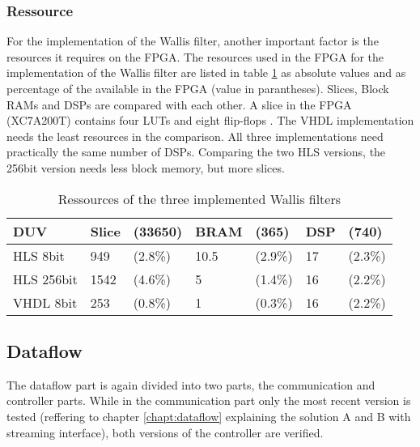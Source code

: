 \subsubsection*{Ressource} \label{ch:ver:ip:ressource}
For the implementation of the Wallis filter, another important factor is the
resources it requires on the FPGA. The resources used in the FPGA for the
implementation of the Wallis filter are listed in table \ref{tab:ressource} as
absolute values and as percentage of the available in the FPGA (value in
parantheses).
Slices, Block RAMs and DSPs are compared with each other. A slice in the FPGA 
(XC7A200T) contains four LUTs and eight flip-flops \cite{ds180}.
The VHDL implementation needs the least resources in the comparison. All
three implementations need practically the same number of DSPs. Comparing
the two HLS versions, the 256bit version needs less block memory, but more
slices.

\begin{table}[tb!]
    \centering
    \begin{tabular}{l l l l l l l}
        \toprule
        DUV         & Slice & (33650) & BRAM & (365) & DSP & (740) \\
        \midrule
        HLS  8bit    & 949 & (2.8\%)   & 10.5 & (2.9\%)  & 17 & (2.3\%) \\
        HLS  256bit  & 1542 & (4.6\%)  & 5 & (1.4\%)     & 16 & (2.2\%) \\
        VHDL 8bit       & 253 & (0.8\%)   & 1 & (0.3\%)     & 16 & (2.2\%) \\
        \bottomrule
    \end{tabular}
    \caption{Ressources of the three implemented Wallis filters}
    \label{tab:ressource}
\end{table}


%
%
\subsection{Dataflow}\label{ch:verification:dataflow}
The dataflow part is again divided into two parts, the communication and
controller parts. While in the communication part only the most recent version
is tested (reffering to chapter \ref{chapt:dataflow} explaining the solution
A and B with streaming interface), both versions of the controller are verified.

